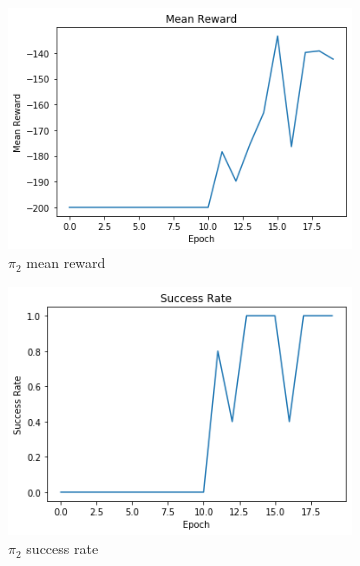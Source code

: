 \documentclass{article}
\begin{document}
\begin{figure}[h!]
\begin{subfigure}[b]{0.3\textwidth}
         	\includegraphics[width=\textwidth]
         	{images/mean_reward_2}
         	\caption{$\pi_2$ mean reward}
         	\label{fig:pi_2_reward}
     	\end{subfigure}
     	\hfill
     	\begin{subfigure}[b]{0.3\textwidth}
         	\centering
         	\includegraphics[width=\textwidth]
         	{images/success_rate_2}
         	\caption{$\pi_2$ success rate}
         	\label{fig:pi_2_reward}
     	\end{subfigure}
     	\hfill
     	\begin{subfigure}[b]{0.3\textwidth}
         	\centering

\end{subfigure}
\end{figure}
\end{document}

